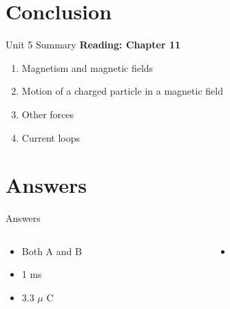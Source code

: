 \documentclass{beamer}
\begin{document}
\section{Conclusion}

\begin{frame}{Unit 5 Summary}
\textbf{Reading: Chapter 11}
\begin{enumerate}
\item Magnetism and magnetic fields
\item \alert{Motion of a charged particle in a magnetic field}
\item Other forces
\item Current loops
\end{enumerate}
\end{frame}

\section{Answers}

\begin{frame}{Answers}
\tiny
\begin{columns}[T]
\begin{column}{0.5\textwidth}
\begin{itemize}
\item Both A and B
\item 1 ms
\item 3.3 $\mu$ C
\end{itemize}
\end{column}
\begin{column}{0.5\textwidth}
\begin{itemize}
\item 
\end{itemize}
\end{column}
\end{columns}
\end{frame}
\end{document}
